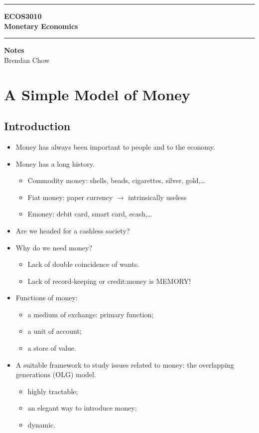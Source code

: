 \documentclass[a4paper,twoside]{article}
\numberwithin{equation}{section}
\numberwithin{figure}{section}
\begin{document}
\begin{titlepage}
	\centering
	\vspace*{4.5cm}
	\rule{\linewidth}{2pt}
	\LARGE\textbf{ECOS3010}\\
	\vspace{0.5cm}
	\Huge\textbf{Monetary Economics}\\
	\rule{\linewidth}{2pt}
	\LARGE\textbf{Notes}\\
	\vspace{1.5cm}
	\Large Brendan Chow
	\vfill
\end{titlepage}
	\newpage
	\pagebreak
	\tableofcontents
	\newpage
{}
\section{A Simple Model of Money}
\subsection{Introduction}
	\begin{itemize}
		\item Money has always been important to people and to the economy.
		\item Money has a long history.
		\begin{itemize}
			\item Commodity money: shells, beads, cigarettes, silver, gold,\ldots
		\item Fiat money: paper currency \( \rightarrow \) intrinsically useless
		\item Emoney: debit card, smart card, ecash,\ldots
		\end{itemize}
		\item  Are we headed for a cashless society?
		\item Why do we need money?
		\begin{itemize}
			\item Lack of double coincidence of wants.
			\item Lack of record-keeping or credit:\@ money is MEMORY!
		\end{itemize}
		\item Functions of money:
		\begin{itemize}
			\item a medium of exchange: primary function;
			\item a unit of account;
			\item a store of value.
		\end{itemize}
		\item A suitable framework to study issues related to money: the overlapping generations (OLG) model.
		\begin{itemize}
			\item highly tractable;
			\item an elegant way to introduce money;
			\item dynamic.
		\end{itemize}
	\end{itemize}
\end{document}
